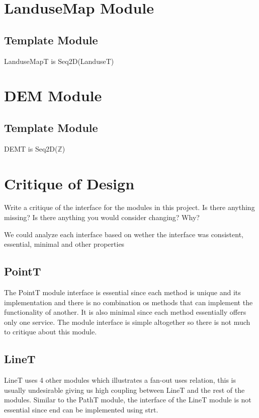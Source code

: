 \documentclass[12pt]{article}
\begin{document}
\section* {LanduseMap Module}

\subsection* {Template Module}

LanduseMapT is Seq2D(LanduseT)

\section* {DEM Module}

\subsection* {Template Module}

DEMT is Seq2D($\mathbb{Z}$)

\newpage

\section*{Critique of Design}

Write a critique of the interface for the modules in this project.  Is there
anything missing?  Is there anything you would consider changing?  Why?

We could analyze each interface based on wether the interface was consistent, essential, minimal and other properties

\subsection{PointT}

	The PointT module interface is essential since each method is unique and its implementation and there is no combination os methods that can implement the functionality of another. It is also minimal since each method essentially offers only one service. The module interface is simple altogether so there is not much to critique about this module.

\subsection{LineT}	

	LineT uses 4 other modules which illustrates a fan-out uses relation, this is usually undesirable giving us high coupling between LineT and the rest of the modules. Similar to the PathT module, the interface of the LineT module is not essential since end can be implemented using strt.    
\end{document}
